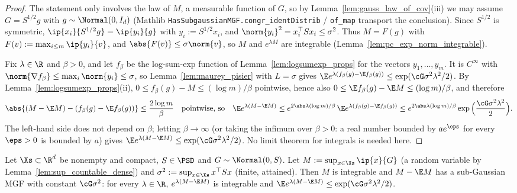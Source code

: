 \begin{proof}
\leanok
{}
The statement only involves the law of $M$, a measurable function of $G$, so by
Lemma~\ref{lem:gauss_law_of_cov}(iii) we may assume $G = S^{1/2}g$ with $g \sim \Normal(0,I_d)$
(Mathlib \texttt{HasSubgaussianMGF.congr\_identDistrib} / \texttt{of\_map} transport the
conclusion). Since $S^{1/2}$ is symmetric, $\ip{x_i}{S^{1/2}g} = \ip{y_i}{g}$ with
$y_i := S^{1/2}x_i$, and $\norm{y_i}^2 = x_i^\top Sx_i \le \sigma^2$. Thus $M = F(g)$ with
$F(v) := \max_{i\le m}\ip{y_i}{v}$, and $\abs{F(v)} \le \sigma\norm{v}$, so $M$ and
$e^{\lambda M}$ are integrable (Lemma~\ref{lem:pc_exp_norm_integrable}).

Fix $\lambda \in \R$ and $\beta > 0$, and let $f_\beta$ be the log-sum-exp function of
Lemma~\ref{lem:logsumexp_props} for the vectors $y_1,\dots,y_m$. It is $C^\infty$ with
$\norm{\nabla f_\beta} \le \max_i\norm{y_i} \le \sigma$, so Lemma~\ref{lem:maurey_pisier} with
$L = \sigma$ gives $\E e^{\lambda(f_\beta(g) - \E f_\beta(g))} \le \exp(\cG\sigma^2\lambda^2/2)$.
By Lemma~\ref{lem:logsumexp_props}(ii), $0 \le f_\beta(g) - M \le (\log m)/\beta$ pointwise,
hence also $0 \le \E f_\beta(g) - \E M \le (\log m)/\beta$, and therefore
\[
  \abs{(M - \E M) - (f_\beta(g) - \E f_\beta(g))} \le \frac{2\log m}{\beta}
  \quad\text{pointwise, so}\quad
  \E e^{\lambda(M - \E M)} \le e^{2\abs\lambda(\log m)/\beta}\,\E e^{\lambda(f_\beta(g) - \E f_\beta(g))}
  \le e^{2\abs\lambda(\log m)/\beta}\exp\Big(\frac{\cG\sigma^2\lambda^2}{2}\Big).
\]
The left-hand side does not depend on $\beta$; letting $\beta \to \infty$ (or taking the
infimum over $\beta > 0$: a real number bounded by $a e^{\eps}$ for every $\eps > 0$ is bounded
by $a$) gives $\E e^{\lambda(M-\E M)} \le \exp(\cG\sigma^2\lambda^2/2)$. No limit theorem for
integrals is needed here.
\end{proof}

\begin{lemma}
\label{lem:compact_sup_subgaussian}
\leanok
{}
Let $\Xs \subset \R^d$ be nonempty and compact, $S \in \PSD$ and $G \sim \Normal(0,S)$. Let
$M := \sup_{x\in\Xs}\ip{x}{G}$ (a random variable by Lemma~\ref{lem:sup_countable_dense})
and $\sigma^2 := \sup_{x\in\Xs}x^\top Sx$ (finite, attained). Then $M$ is integrable and
$M - \E M$ has a sub-Gaussian MGF with constant $\cG\sigma^2$: for every $\lambda\in\R$,
$e^{\lambda(M-\E M)}$ is integrable and $\E e^{\lambda(M - \E M)} \le \exp(\cG\sigma^2\lambda^2/2)$.
\end{lemma}

